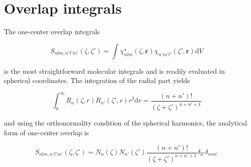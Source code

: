 \documentclass[a4paper]{article}
\newcommand{\bold}[1]{\mathbf{#1}}
\newcommand{\dd}{\mathrm{d}}
\begin{document}
\section{Overlap integrals}

The one-center overlap integrals

\begin{equation}
  S_{nlm,n'l'm'}(\zeta, \zeta') = 
  \int \chi_{nlm}^{\star}(\zeta, \bold{r}) 
  \chi_{n'm'l'}(\zeta', \bold{r}) \dd V 
  \label{eq:1c_overlap_integral} 
\end{equation}

is the most straightforward molecular integrals and is readily evaluated in
spherical coordinates. The integration of the radial part yields

\begin{equation}
  \int_0^{\infty} R_n(\zeta,r) R_{n'}(\zeta',r) r^2 \dd r = 
  \frac{(n+n')!}{(\zeta+\zeta')^{n+n'+1}}
  \label{eq:1c_overlap_integral_radial_part_eval}
\end{equation}

and using the orthonormality condition of the spherical harmonics, the analytical
form of one-center overlap is

\begin{equation}
  S_{nlm,n'l'm'}(\zeta, \zeta') = 
  N_n(\zeta) N_{n'}(\zeta') 
  \frac{(n+n')!}{(\zeta+\zeta')^{n+n'+1}}
  \delta_{ll'}\delta_{mm'}
\label{eq:1c_overlap_integral_result}
\end{equation}
\end{document}
